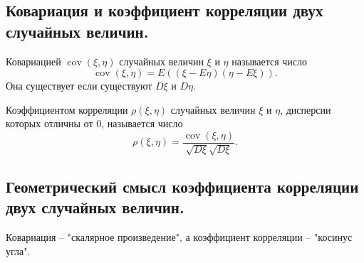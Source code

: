 \subsection{Ковариация и коэффициент корреляции двух случайных величин.}
\begin{definition}
    Ковариацией $\operatorname{cov}  (\xi, \eta)$ случайных величин $\xi$ и $\eta$ называется число
    \[
        \operatorname{cov} (\xi, \eta) = E((\xi - E \eta)(\eta - E \xi)).
    \]
    Она существует если существуют $D \xi $ и $D \eta$.
\end{definition}
\begin{definition}
    Коэффициентом корреляции $\rho(\xi, \eta)$ случайных величин $\xi$ и $\eta$, дисперсии которых отличны от 0, называется число
    \[
        \rho(\xi, \eta) = \frac{
            \operatorname{cov}  (\xi, \eta)
        }{
            \sqrt{D \xi} \sqrt{D \xi}
        }.
    \]
\end{definition}

\subsection{Геометрический смысл коэффициента корреляции двух случайных величин.}
Ковариация -- "скалярное произведение", а коэффициент корреляции -- "косинус угла".